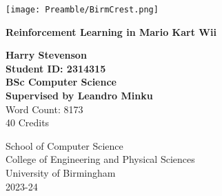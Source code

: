 
\thispagestyle{empty}

\begin{spacing}{2}
	\begin{center}
		\texttt{[image: Preamble/BirmCrest.png]}
	\end{center}
	\vspace{10mm}
	\begin{center}
		\textbf{\Large Reinforcement Learning in Mario Kart Wii}
		\vspace{10mm}
	\end{center}
	\begin{center}
		\vspace{20mm}
		\textbf{\Large Harry Stevenson}
            \\\textbf{\large Student ID: 2314315}
            \\\textbf{\large BSc Computer Science}
            \\\textbf{\large Supervised by Leandro Minku}
            \\Word Count: 8173
            \\ 40 Credits
		\vspace{20mm}
	\end{center}
	\begin{center}
		{\large School of Computer Science}
		\\ {\large College of Engineering and Physical Sciences}
		\\ {\large University of Birmingham}
		\\ {\large 2023-24}
	\end{center}
\end{spacing}



